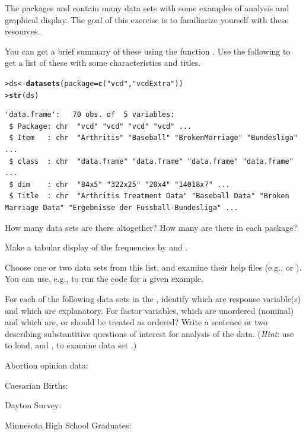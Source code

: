 \documentclass[10pt,krantz2]{krantz}\usepackage[]{graphicx}\usepackage[]{color}
\makeatletter
\newcommand{\hlstr}[1]{\textcolor[rgb]{0.192,0.494,0.8}{#1}}%
\newcommand{\hlstd}[1]{\textcolor[rgb]{0.345,0.345,0.345}{#1}}%
\newcommand{\hlkwb}[1]{\textcolor[rgb]{0.69,0.353,0.396}{#1}}%
\newcommand{\hlkwc}[1]{\textcolor[rgb]{0.333,0.667,0.333}{#1}}%
\newcommand{\hlkwd}[1]{\textcolor[rgb]{0.737,0.353,0.396}{\textbf{#1}}}%
\newenvironment{kframe}{%
 \def\at@end@of@kframe{}%
 \ifinner\ifhmode%
  \def\at@end@of@kframe{\end{minipage}}%
  \begin{minipage}{\columnwidth}%
 \fi\fi%
 \def\FrameCommand##1{\hskip\@totalleftmargin \hskip-\fboxsep
 \colorbox{shadecolor}{##1}\hskip-\fboxsep
     \hskip-\linewidth \hskip-\@totalleftmargin \hskip\columnwidth}%
 \MakeFramed {\advance\hsize-\width
   \@totalleftmargin\z@ \linewidth\hsize
   \@setminipage}}%
 {\par\unskip\endMakeFramed%
 \at@end@of@kframe}
\newenvironment{knitrout}{}{} %
\renewenvironment{knitrout}{\small\renewcommand{\baselinestretch}{.85}}{} %
\makeatother
\begin{document}
\begin{Exercises}

\exercise The packages  and  contain many data sets with some
examples of analysis and graphical display.  The goal of this exercise is to
familiarize yourself with these resources.

You can get a brief summary of
these using the function .  Use the following to get a list of
these with some characteristics and titles.
\begin{knitrout}\footnotesize
{}\color{fgcolor}\begin{kframe}
\begin{alltt}
\hlstd{> }\hlstd{ds} \hlkwb{<-} \hlkwd{datasets}\hlstd{(}\hlkwc{package}\hlstd{=}\hlkwd{c}\hlstd{(}\hlstr{"vcd"}\hlstd{,} \hlstr{"vcdExtra"}\hlstd{))}
\hlstd{> }\hlkwd{str}\hlstd{(ds)}
\end{alltt}
\begin{verbatim}
'data.frame':	70 obs. of  5 variables:
 $ Package: chr  "vcd" "vcd" "vcd" "vcd" ...
 $ Item   : chr  "Arthritis" "Baseball" "BrokenMarriage" "Bundesliga" ...
 $ class  : chr  "data.frame" "data.frame" "data.frame" "data.frame" ...
 $ dim    : chr  "84x5" "322x25" "20x4" "14018x7" ...
 $ Title  : chr  "Arthritis Treatment Data" "Baseball Data" "Broken Marriage Data" "Ergebnisse der Fussball-Bundesliga" ...
\end{verbatim}
\end{kframe}
\end{knitrout}
  \begin{enumerate*}
    \item How many data sets are there altogether?  How many are there in each package?
    \item Make a tabular display of the frequencies by  and .
    \item Choose one or two data sets from this list, and examine their help files
    (e.g.,  or ).  You can use, e.g.,
     to run the \R code for a given example.
  \end{enumerate*}

\exercise For each of the following data sets in the , identify which are response variable(s)
and which are explanatory. For factor variables, which are unordered (nominal) and which
are, or should be treated as ordered? Write a sentence or two describing substantitive questions of interest for analysis
of the data. (\emph{Hint}: use 
 to load, and , 
   to examine data set .)
  \begin{enumerate*}
    \item Abortion opinion data: 
    \item Caesarian Births: 
    \item Dayton Survey: 
    \item Minnesota High School Graduates: 
  \end{enumerate*}


\end{Exercises}
\end{document}
